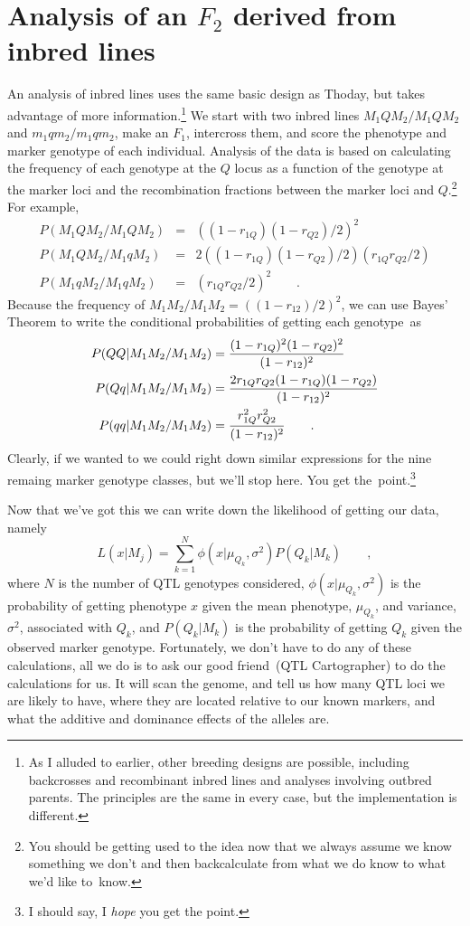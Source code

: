 \section*{Analysis of an $F_2$ derived from inbred lines}

An analysis of inbred lines uses the same basic design as Thoday, but
takes advantage of more information.\footnote{As I alluded to earlier,
  other breeding designs are possible, including backcrosses and
  recombinant inbred lines and analyses involving outbred parents. The
  principles are the same in every case, but the implementation is
  different.} We start with two inbred lines $M_1QM_2/M_1QM_2$ and
$m_1qm_2/m_1qm_2$, make an $F_1$, intercross them, and score the
phenotype and marker genotype of each individual. Analysis of the data
is based on calculating the frequency of each genotype at the $Q$
locus as a function of the genotype at the marker loci and the
recombination fractions between the marker loci and $Q$.\footnote{You
  should be getting used to the idea now that we always assume we know
  something we don't and then backcalculate from what we do know to
  what we'd like to~know.} For example,
\begin{eqnarray*}
P(M_1QM_2/M_1QM_2) &=& \left((1-r_{1Q})(1-r_{Q2})/2\right)^2 \\
P(M_1QM_2/M_1qM_2) &=& 2\left((1-r_{1Q})(1-r_{Q2})/2\right)
                       \left(r_{1Q}r_{Q2}/2\right) \\
P(M_1qM_2/M_1qM_2) &=& \left(r_{1Q}r_{Q2}/2\right)^2 \qquad .
\end{eqnarray*}
Because the frequency of $M_1M_2/M_1M_2 = \left((1-r_{12})/2\right)^2$,
we can use Bayes' Theorem to write the conditional probabilities of
getting each genotype~as
\begin{eqnarray*}
P(QQ|M_1M_2/M_1M_2) &= {(1-r_{1Q})^2(1-r_{Q2})^2 \over (1-r_{12})^2} \\
P(Qq|M_1M_2/M_1M_2) &= {2r_{1Q}r_{Q2}(1-r_{1Q})(1-r_{Q2})
                       \over (1-r_{12})^2} \\
P(qq|M_1M_2/M_1M_2) &= {r_{1Q}^2 r_{Q2}^2 \over (1-r_{12})^2} 
                       \qquad .
\end{eqnarray*}
Clearly, if we wanted to we could right down similar expressions for
the nine remaing marker genotype classes, but we'll stop here. You get
the~point.\footnote{I should say, I {\it hope\/} you get the point.}

Now that we've got this we can write down the likelihood of getting
our data, namely
\[
L(x|M_j) = \sum_{k=1}^N \phi (x|\mu_{Q_k}, \sigma^2) P(Q_k|M_k) \qquad ,
\]
where $N$ is the number of QTL genotypes considered, $\phi
(x|\mu_{Q_k}, \sigma^2)$ is the probability of getting phenotype $x$
given the mean phenotype, $\mu_{Q_k}$, and variance, $\sigma^2$,
associated with $Q_k$, and $P(Q_k|M_k)$ is the probability of getting
$Q_k$ given the observed marker genotype. Fortunately, we don't have
to do any of these calculations, all we do is to ask our good
friend~(QTL Cartographer) to do the calculations for us. It will scan
the genome, and tell us how many QTL loci we are likely to have, where
they are located relative to our known markers, and what the additive
and dominance effects of the alleles are. 

